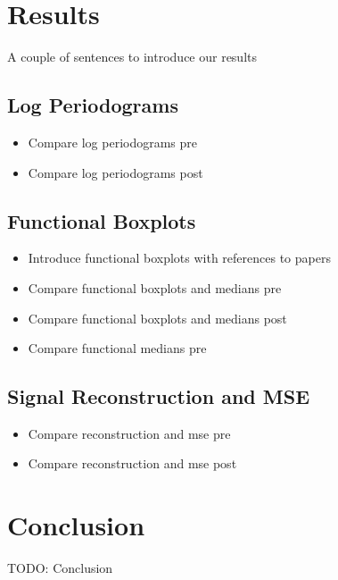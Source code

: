 \documentclass[12pt]{article}
\begin{document}
\section{Results} \label{sec:results}
A couple of sentences to introduce our results

\subsection{Log Periodograms} \label{sec:lp}
\begin{itemize}
\item Compare log periodograms pre
\item Compare log periodograms post
\end{itemize}

\subsection{Functional Boxplots} \label{sec:fb}
\begin{itemize}
\item Introduce functional boxplots with references to papers
\item Compare functional boxplots and medians pre
\item Compare functional boxplots and medians post
\item Compare functional medians pre
\end{itemize}


\subsection{Signal Reconstruction and MSE} \label{sec:mse}
\begin{itemize}
\item Compare reconstruction and mse pre
\item Compare reconstruction and mse post
\end{itemize}



\section{Conclusion} \label{sec:conclusion}
TODO: Conclusion



\end{document}
